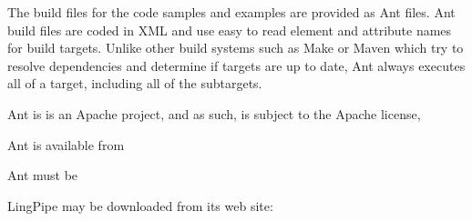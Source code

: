
\noindent
The build files for the code samples and examples are provided as Ant
files.  Ant build files are coded in XML and use easy to read element
and attribute names for build targets.  Unlike other build systems
such as Make or Maven which try to resolve dependencies and determine
if targets are up to date, Ant always executes all of a target,
including all of the subtargets.

Ant is is an Apache project, and as such, is subject to the Apache license,
\begin{quote}
\end{quote}

Ant is available from 

\begin{quote}
\end{quote}

Ant must be 



\noindent
LingPipe may be downloaded from its web site:

\begin{quote}
\end{quote}


